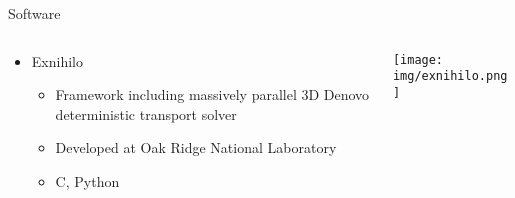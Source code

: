 \documentclass[handout]{beamer} %
\newcommand{\cpp}{C\nolinebreak\hspace{-.05em}\raisebox{.4ex}{\tiny\bf +}\nolinebreak\hspace{-.10em}\raisebox{.4ex}{\tiny\bf +}}
\begin{document}
\begin{frame}{Software\nocite{exum,denovo}}
%
\begin{columns}
\begin{column}{0.5\textwidth}
\begin{itemize}
\item{Exnihilo}
\begin{itemize}
\item{Framework including massively parallel 3D Denovo deterministic transport solver}
\item{Developed at Oak Ridge National Laboratory}
\item{\cpp, Python}
\end{itemize}
\end{itemize}
\end{column}
%
\begin{column}{0.5\textwidth}
\texttt{[image: img/exnihilo.png]}
\end{column}
\end{columns}
%
\end{frame}
\end{document}

